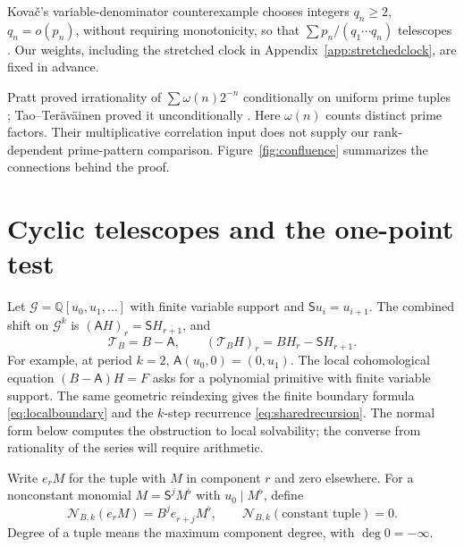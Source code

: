 \documentclass[11pt,a4paper]{article}
\newcommand{\Q}{\mathbb Q}
\begin{document}
Kova\v{c}'s variable-denominator counterexample chooses integers $q_n\ge2$,
$q_n=o(p_n)$, without requiring monotonicity, so that
$\sum p_n/(q_1\cdots q_n)$ telescopes \cite{kovacforum}.
Our weights, including the stretched clock in
Appendix~\ref{app:stretchedclock}, are fixed in advance.

Pratt proved irrationality of $\sum\omega(n)2^{-n}$ conditionally on
uniform prime tuples \cite{pratt}; Tao--Ter\"av\"ainen proved it
unconditionally \cite{taoteravainen}. Here $\omega(n)$ counts distinct
prime factors. Their multiplicative correlation input does not supply
our rank-dependent prime-pattern comparison.
Figure~\ref{fig:confluence} summarizes the connections behind the proof.

\section[Telescopes and the one-point test]{Cyclic telescopes and the one-point test}\label{sec:algebra}

Let $\mathcal G=\Q[u_0,u_1,\ldots]$ with finite variable support and
$\mathsf S u_i=u_{i+1}$. The combined shift on $\mathcal G^k$ is
$(\mathsf AH)_r=\mathsf S H_{\overline{r+1}}$, and
\[
 \mathcal T_B=B-\mathsf A,\qquad
 (\mathcal T_BH)_r=BH_r-\mathsf S H_{\overline{r+1}}.
\]
For example, at period $k=2$, $\mathsf A(u_0,0)=(0,u_1)$.
The local cohomological equation $(B-\mathsf A)H=F$ asks for a
polynomial primitive with finite variable support. The same geometric
reindexing gives the finite boundary formula \eqref{eq:localboundary}
and the $k$-step recurrence \eqref{eq:sharedrecursion}.
The normal form below computes the obstruction to local solvability;
the converse from rationality of the series will require arithmetic.

Write $e_rM$ for the tuple with $M$ in component $r$ and zero elsewhere.
For a nonconstant monomial $M=\mathsf S^jM^\flat$ with $u_0\mid M^\flat$,
define
\[
 \mathcal N_{B,k}(e_rM)=B^j e_{\overline{r+j}}M^\flat,
 \qquad \mathcal N_{B,k}(\text{constant tuple})=0.
\]
Degree of a tuple means the maximum component degree, with $\deg0=-\infty$.
\end{document}
